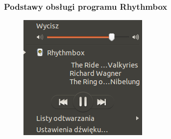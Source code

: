 \subsubsection{Podstawy obsługi programu Rhythmbox}
\begin{figure}
                \includegraphics[width=\linewidth]{images/programy_rhythmbox2.png}
\end{figure}

